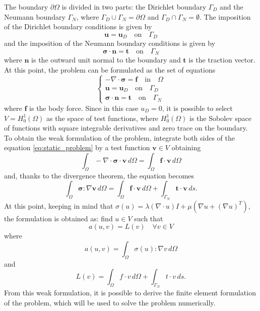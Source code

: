 The boundary \( \partial \Omega \) is divided in two parts: the Dirichlet boundary \( \Gamma_D \) and the Neumann boundary \( \Gamma_N \), where \(\Gamma_D \cup \Gamma_N = \partial \Omega \) and \(\Gamma_D \cap \Gamma_N = \emptyset \). The imposition of the Dirichlet boundary conditions is given by
\begin{equation}
    \bm{u} = \bm{u}_D \quad \text{on} \quad \Gamma_D
\end{equation}
and the imposition of the Neumann boundary conditions is given by
\begin{equation}
    \bm{\sigma} \cdot \bm{n} = \bm{t} \quad \text{on} \quad \Gamma_N
\end{equation}
where \( \bm{n} \) is the outward unit normal to the boundary and \( \bm{t} \) is the traction vector. 
At this point, the problem can be formulated as the set of equations
\begin{equation}
    \begin{cases}
        -\nabla \cdot \bm{\sigma} = \bm{f} \quad \text{in} \quad \Omega \\
        \bm{u} = \bm{u}_D \quad \text{on} \quad \Gamma_D \\
        \bm{\sigma} \cdot \bm{n} = \bm{t} \quad \text{on} \quad \Gamma_N
    \end{cases}
\label{eq:static_problem}
\end{equation}
where \( \bm{f} \) is the body force. 
Since in this case \(u_D = 0\), it is possible to select \(V = H^1_0(\Omega)\) as the space of test functions, where \(H^1_0(\Omega)\) is the Sobolev space of functions with square integrable derivatives and zero trace on the boundary. To obtain the weak formulation of the problem, integrate both sides of the equation \eqref{eq:static_problem} by a test function \( \bm{v} \in V \) obtaining 
\begin{equation}
    \int_{\Omega} -\nabla \cdot \bm{\sigma} \cdot \bm{v} \, d\Omega = \int_{\Omega} \bm{f} \cdot \bm{v} \, d\Omega
\end{equation}
and, thanks to the divergence theorem, the equation becomes
\begin{equation}
    \int_{\Omega} \bm{\sigma} : \nabla \bm{v} \, d\Omega = \int_{\Omega} \bm{f} \cdot \bm{v} \, d\Omega + \int_{\Gamma_N} \bm{t} \cdot \bm{v} \, ds.
\end{equation}
At this point, keeping in mind that \(\sigma(u) = \lambda(\nabla \cdot u)I + \mu (\nabla u + (\nabla u)^T)\), the formulation is obtained as: find \(u \in V\) such that
\begin{equation}
    a(u,v) = L(v) \quad \forall v \in V
\end{equation}
where
\begin{equation}
    a(u,v) = \int_{\Omega} \sigma(u) : \nabla v \, d\Omega
\end{equation}
and
\begin{equation}
    L(v) = \int_{\Omega} f \cdot v \, d\Omega + \int_{\Gamma_N} t \cdot v \, ds.
\end{equation}
From this weak formulation, it is possible to derive the finite element formulation of the problem, which will be used to solve the problem numerically.

